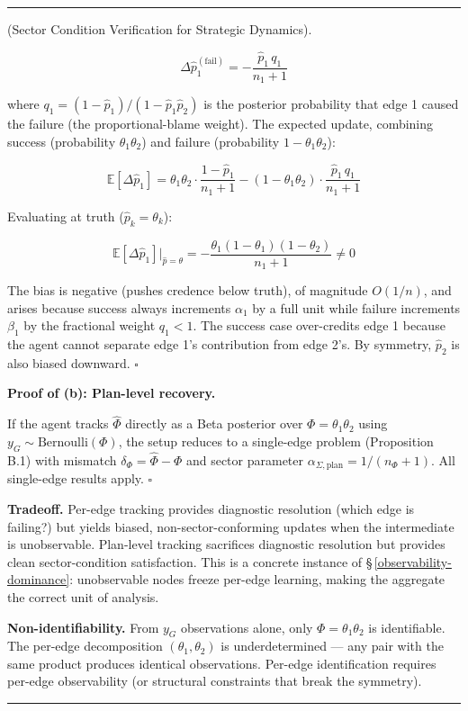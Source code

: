 \documentclass[11pt,oneside]{article}
\newcounter{claim}[section]
\renewcommand{\theclaim}{\thesection.\arabic{claim}}
\newenvironment{segment}[2]{%
  \refstepcounter{claim}%
  \bigskip\noindent\hrule\smallskip
  \noindent{\bfseries #1~\theclaim}\enskip(#2).\par\smallskip
  \noindent\ignorespaces
}{%
  \par\smallskip\noindent\hrule\bigskip
}
\newenvironment{derivation}[1][]{\begin{segment}{Derivation}{#1}}{\end{segment}}
\begin{document}
\begin{derivation}[Sector Condition Verification for Strategic Dynamics]

$$\Delta \hat p_1^{(\text{fail})} = -\frac{\hat p_1 \, q_1}{n_1 + 1}$$

where $q_1 = (1 - \hat p_1)/(1 - \hat p_1 \hat p_2)$ is the posterior probability that edge 1 caused the failure (the proportional-blame weight). The expected update, combining success (probability $\theta_1\theta_2$) and failure (probability $1 - \theta_1\theta_2$):


$$\mathbb{E}[\Delta \hat p_1] = \theta_1\theta_2 \cdot \frac{1 - \hat p_1}{n_1+1} - (1-\theta_1\theta_2)\cdot\frac{\hat p_1\,q_1}{n_1+1}$$

Evaluating at truth ($\hat p_k = \theta_k$):


$$\mathbb{E}[\Delta \hat p_1]\big\rvert_{\hat p = \theta} = -\frac{\theta_1(1-\theta_1)(1-\theta_2)}{n_1+1} \neq 0$$

The bias is negative (pushes credence below truth), of magnitude $O(1/n)$, and arises because success always increments $\alpha_1$ by a full unit while failure increments $\beta_1$ by the fractional weight $q_1 < 1$. The success case over-credits edge 1 because the agent cannot separate edge 1's contribution from edge 2's. By symmetry, $\hat p_2$ is also biased downward. $\square$

\textbf{Proof of (b): Plan-level recovery.}

If the agent tracks $\hat\Phi$ directly as a Beta posterior over $\Phi = \theta_1\theta_2$ using $y_G \sim \text{Bernoulli}(\Phi)$, the setup reduces to a single-edge problem (Proposition B.1) with mismatch $\delta_\Phi = \hat\Phi - \Phi$ and sector parameter $\alpha_{\Sigma,\text{plan}} = 1/(n_\Phi + 1)$. All single-edge results apply. $\square$

\textbf{Tradeoff.} Per-edge tracking provides diagnostic resolution (which edge is failing?) but yields biased, non-sector-conforming updates when the intermediate is unobservable. Plan-level tracking sacrifices diagnostic resolution but provides clean sector-condition satisfaction. This is a concrete instance of \S\,\ref{observability-dominance}: unobservable nodes freeze per-edge learning, making the aggregate the correct unit of analysis.

\textbf{Non-identifiability.} From $y_G$ observations alone, only $\Phi = \theta_1\theta_2$ is identifiable. The per-edge decomposition $(\theta_1, \theta_2)$ is underdetermined --- any pair with the same product produces identical observations. Per-edge identification requires per-edge observability (or structural constraints that break the symmetry).




\end{derivation}
\end{document}
